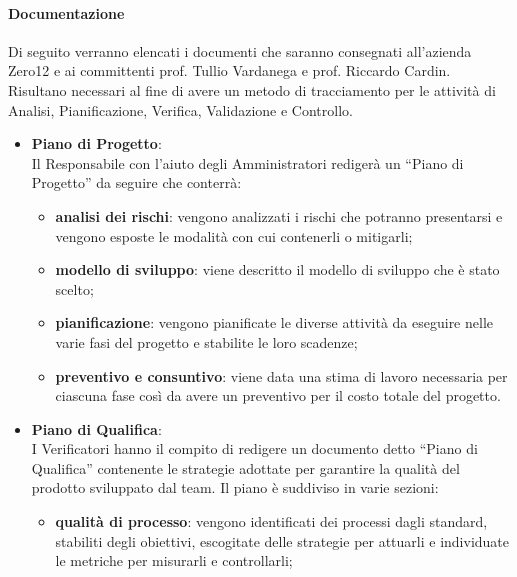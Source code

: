             \paragraph{Documentazione}
                Di seguito verranno elencati i documenti che saranno consegnati all’azienda Zero12 e ai committenti prof. Tullio Vardanega e prof. Riccardo Cardin. Risultano necessari al fine di avere un metodo di tracciamento per le attività di Analisi, Pianificazione, Verifica, Validazione e Controllo.\\
                \begin{itemize}
                    \item\textbf{Piano di Progetto}:\\
                        Il Responsabile con l’aiuto degli Amministratori redigerà un “Piano di Progetto” da seguire che conterrà: \\
                        \begin{itemize}
                            \item\textbf{analisi dei rischi}: vengono analizzati i rischi che potranno presentarsi e vengono esposte le modalità con cui contenerli o mitigarli;
                            \item\textbf{modello di sviluppo}: viene descritto il modello di sviluppo che è stato scelto;
                            \item\textbf{pianificazione}: vengono pianificate le diverse attività da eseguire nelle varie fasi del progetto e stabilite le loro scadenze;
                            \item\textbf{preventivo e consuntivo}: viene data una stima di lavoro necessaria per ciascuna fase così da avere un preventivo per il costo totale del progetto.
                        \end{itemize}
                    \item\textbf{Piano di Qualifica}:\\
                        I Verificatori hanno il compito di redigere un documento detto “Piano di Qualifica” contenente le strategie adottate per garantire la qualità del prodotto sviluppato dal team.
                        Il piano è suddiviso in varie sezioni:
                        \begin{itemize}
                            \item\textbf{qualità di processo}: vengono identificati dei processi dagli standard, stabiliti degli obiettivi, escogitate delle strategie per attuarli e individuate le metriche per misurarli e controllarli;

\end{itemize}
\end{itemize}
